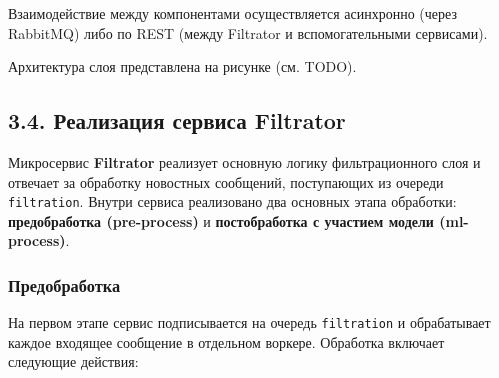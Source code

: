 Взаимодействие между компонентами осуществляется асинхронно (через
RabbitMQ) либо по REST (между Filtrator и вспомогательными сервисами).

Архитектура слоя представлена на рисунке (см. TODO).

\hypertarget{ux440ux435ux430ux43bux438ux437ux430ux446ux438ux44f-ux441ux435ux440ux432ux438ux441ux430-filtrator}{%
\subsection{3.4. Реализация сервиса
Filtrator}\label{ux440ux435ux430ux43bux438ux437ux430ux446ux438ux44f-ux441ux435ux440ux432ux438ux441ux430-filtrator}}

Микросервис \textbf{Filtrator} реализует основную логику фильтрационного
слоя и отвечает за обработку новостных сообщений, поступающих из очереди
\texttt{filtration}. Внутри сервиса реализовано два основных этапа
обработки: \textbf{предобработка (pre-process)} и \textbf{постобработка
с участием модели (ml-process)}.

\hypertarget{ux43fux440ux435ux434ux43eux431ux440ux430ux431ux43eux442ux43aux430}{%
\subsubsection{\texorpdfstring{\textbf{Предобработка}}{Предобработка}}\label{ux43fux440ux435ux434ux43eux431ux440ux430ux431ux43eux442ux43aux430}}

На первом этапе сервис подписывается на очередь \texttt{filtration} и
обрабатывает каждое входящее сообщение в отдельном воркере. Обработка
включает следующие действия:

